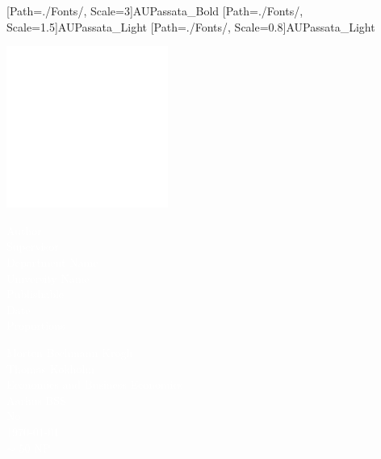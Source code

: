  
\thispagestyle{empty}

\pagecolor{AUdefault}\afterpage{\nopagecolor}
 
\newfontfamily{\AUPB}[Path=./Fonts/, Scale=3]{AUPassata_Bold}
\newfontfamily{\AUPL}[Path=./Fonts/, Scale=1.5]{AUPassata_Light}
\newfontfamily{\AUPLSmall}[Path=./Fonts/, Scale=0.8]{AUPassata_Light}



{\includegraphics[width=200px, left]{Figures/Logos/AarhusBSSlogo_neg_square.eps} }



\vspace{1.5cm}


{\raggedleft{\AUPB \textcolor{white}{
Artificial Neural Network's - Should banks employ ANN for default prediction?}}}%

\vspace{1.5cm}

\begin{minipage}[c]{0.5\textwidth}
\raggedright{\AUPL \textcolor{white}{ 
       Author \\
       Supervisor\\
       Department Name\\
       University Name\\
       Publishable\\
       Date\\
       Proportions
       }}
\end{minipage}%
\begin{minipage}[d]{0.5\textwidth}
\raggedright{\AUPL \textcolor{white}{ 
       Morten Bechmann Krogh\\
       Thomas Kokholm\\
       Economics and Business Economics
       \\
       Aarhus BSS\\
       No\\
       \today\\
       $\sim$ 50 NP
       }}
\end{minipage}%

